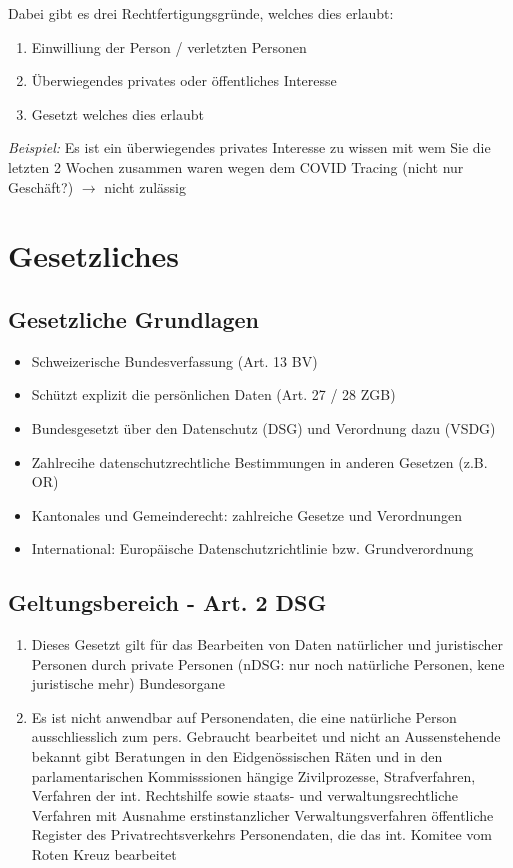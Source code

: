 \documentclass{report}
\theoremstyle{definition}
\theoremstyle{example}
\begin{document}
Dabei gibt es drei Rechtfertigungsgründe, welches dies erlaubt:
\begin{enumerate}
   \item Einwilliung der Person / verletzten Personen
   \item Überwiegendes privates oder öffentliches Interesse
   \item Gesetzt welches dies erlaubt
\end{enumerate}

\textit{Beispiel:} Es ist ein überwiegendes privates Interesse zu wissen mit wem Sie die letzten 2 Wochen zusammen waren wegen dem COVID Tracing (nicht nur Geschäft?) $\rightarrow$ nicht zulässig

\section{Gesetzliches}

\subsection{Gesetzliche Grundlagen}
\begin{itemize}
   \item Schweizerische Bundesverfassung (Art. 13 BV)
   \item Schützt explizit die persönlichen Daten (Art. 27 / 28 ZGB) 
   \item Bundesgesetzt über den Datenschutz (DSG) und Verordnung dazu (VSDG)
   \item Zahlrecihe datenschutzrechtliche Bestimmungen in anderen Gesetzen (z.B. OR)
   \item Kantonales und Gemeinderecht: zahlreiche Gesetze und Verordnungen
   \item International: Europäische Datenschutzrichtlinie bzw. Grundverordnung
\end{itemize}

\subsection{Geltungsbereich - Art. 2 DSG}
\begin{enumerate}
   \item Dieses Gesetzt gilt für das Bearbeiten von Daten natürlicher und juristischer Personen durch
   \subitem private Personen (nDSG: nur noch natürliche Personen, kene juristische mehr)
   \subitem Bundesorgane
   \item Es ist nicht anwendbar auf
   \subitem Personendaten, die eine natürliche Person ausschliesslich zum pers. Gebraucht bearbeitet und nicht an Aussenstehende bekannt gibt
   \subitem Beratungen in den Eidgenössischen Räten und in den parlamentarischen Kommisssionen
   \subitem hängige Zivilprozesse, Strafverfahren, Verfahren der int. Rechtshilfe sowie staats- und verwaltungsrechtliche Verfahren mit Ausnahme erstinstanzlicher Verwaltungsverfahren
   \subitem öffentliche Register des Privatrechtsverkehrs
   \subitem Personendaten, die das int. Komitee vom Roten Kreuz bearbeitet
\end{enumerate}
\end{document}
